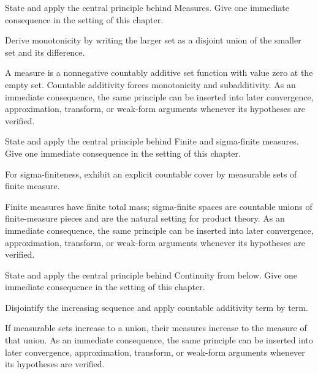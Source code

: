 \begin{exercise}\label{exr:iii01-04}
State and apply the central principle behind Measures. Give one immediate consequence in the setting of this chapter.
\end{exercise}
\begin{hint}
Derive monotonicity by writing the larger set as a disjoint union of the smaller set and its difference.
\end{hint}
\begin{solution}
A measure is a nonnegative countably additive set function with value zero at the empty set. Countable additivity forces monotonicity and subadditivity. As an immediate consequence, the same principle can be inserted into later convergence, approximation, transform, or weak-form arguments whenever its hypotheses are verified.
\end{solution}

\begin{exercise}\label{exr:iii01-05}
State and apply the central principle behind Finite and sigma-finite measures. Give one immediate consequence in the setting of this chapter.
\end{exercise}
\begin{hint}
For sigma-finiteness, exhibit an explicit countable cover by measurable sets of finite measure.
\end{hint}
\begin{solution}
Finite measures have finite total mass; sigma-finite spaces are countable unions of finite-measure pieces and are the natural setting for product theory. As an immediate consequence, the same principle can be inserted into later convergence, approximation, transform, or weak-form arguments whenever its hypotheses are verified.
\end{solution}

\begin{exercise}\label{exr:iii01-06}
State and apply the central principle behind Continuity from below. Give one immediate consequence in the setting of this chapter.
\end{exercise}
\begin{hint}
Disjointify the increasing sequence and apply countable additivity term by term.
\end{hint}
\begin{solution}
If measurable sets increase to a union, their measures increase to the measure of that union. As an immediate consequence, the same principle can be inserted into later convergence, approximation, transform, or weak-form arguments whenever its hypotheses are verified.
\end{solution}

